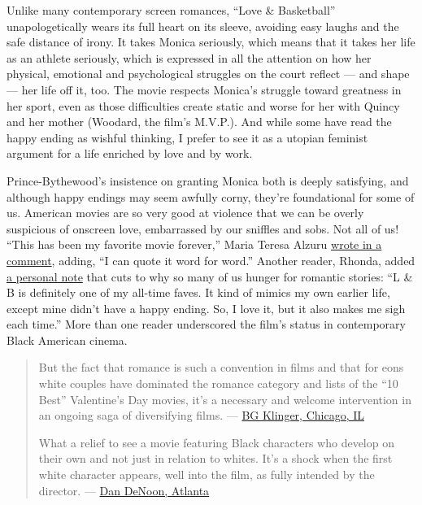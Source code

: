 Unlike many contemporary screen romances, ``Love \& Basketball''
unapologetically wears its full heart on its sleeve, avoiding easy
laughs and the safe distance of irony. It takes Monica seriously, which
means that it takes her life as an athlete seriously, which is expressed
in all the attention on how her physical, emotional and psychological
struggles on the court reflect --- and shape --- her life off it, too.
The movie respects Monica's struggle toward greatness in her sport, even
as those difficulties create static and worse for her with Quincy and
her mother (Woodard, the film's M.V.P.). And while some have read the
happy ending as wishful thinking, I prefer to see it as a utopian
feminist argument for a life enriched by love and by work.

Prince-Bythewood's insistence on granting Monica both is deeply
satisfying, and although happy endings may seem awfully corny, they're
foundational for some of us. American movies are so very good at
violence that we can be overly suspicious of onscreen love, embarrassed
by our sniffles and sobs. Not all of us! ``This has been my favorite
movie forever,'' Maria Teresa Alzuru
\href{https://nyti.ms/2ElrGgy\#permid=108333899}{wrote in a comment},
adding, ``I can quote it word for word.'' Another reader, Rhonda, added
\href{https://nyti.ms/3gdHvUI\#permid=108310594}{a personal note} that
cuts to why so many of us hunger for romantic stories: ``L \& B is
definitely one of my all-time faves. It kind of mimics my own earlier
life, except mine didn't have a happy ending. So, I love it, but it also
makes me sigh each time.'' More than one reader underscored the film's
status in contemporary Black American cinema.

\begin{quote}
But the fact that romance is such a convention in films and that for
eons white couples have dominated the romance category and lists of the
``10 Best'' Valentine's Day movies, it's a necessary and welcome
intervention in an ongoing saga of diversifying films. ---
\href{https://nyti.ms/3hMiNei\#permid=108346903}{BG Klinger, Chicago,
IL}

What a relief to see a movie featuring Black characters who develop on
their own and not just in relation to whites. It's a shock when the
first white character appears, well into the film, as fully intended by
the director. --- \href{https://nyti.ms/3320hL5\#permid=108331295}{Dan
DeNoon, Atlanta}
\end{quote}

